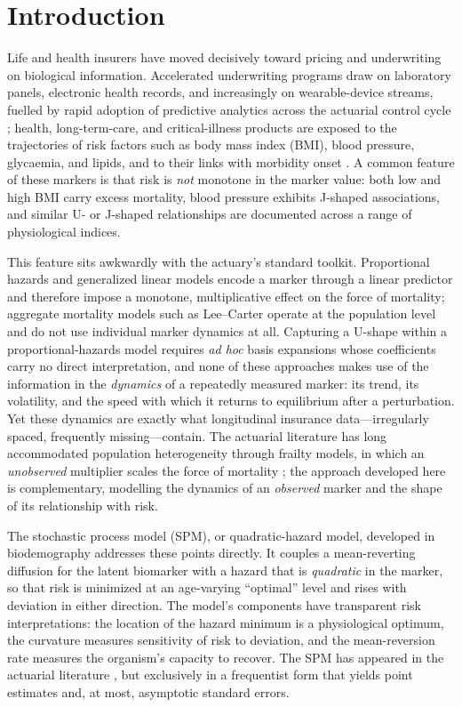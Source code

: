 \documentclass[review,3p,times]{elsarticle}
\begin{document}
\section{Introduction}\label{sec:intro}

Life and health insurers have moved decisively toward pricing and underwriting on
biological information. Accelerated underwriting programs draw on laboratory
panels, electronic health records, and increasingly on wearable-device streams,
fuelled by rapid adoption of predictive analytics across the actuarial control
cycle \citep{Richman2021}; health, long-term-care, and critical-illness products
are exposed to the trajectories of risk factors such as body mass index (BMI),
blood pressure, glycaemia, and lipids, and to their links with morbidity onset
\citep{HabermanPitacco1999}. A common feature of these markers is that risk is
\emph{not} monotone in the marker value: both low and high BMI carry excess
mortality, blood pressure exhibits J-shaped associations, and similar U- or
J-shaped relationships are documented across a range of physiological indices.

This feature sits awkwardly with the actuary's standard toolkit. Proportional
hazards and generalized linear models encode a marker through a linear predictor
and therefore impose a monotone, multiplicative effect on the force of mortality;
aggregate mortality models such as Lee--Carter \citep{LeeCarter1992} operate at the
population level and do not use individual marker dynamics at all. Capturing a U-shape within a
proportional-hazards model requires \emph{ad hoc} basis expansions whose
coefficients carry no direct interpretation, and none of these approaches makes
use of the information in the \emph{dynamics} of a repeatedly measured marker:
its trend, its volatility, and the speed with which it returns to equilibrium
after a perturbation. Yet these dynamics are exactly what longitudinal insurance
data---irregularly spaced, frequently missing---contain. The actuarial literature
has long accommodated population heterogeneity through frailty models, in which an
\emph{unobserved} multiplier scales the force of mortality
\citep{VaupelMantonStallard1979,SuSherris2012,Pitacco2019}; the approach developed
here is complementary, modelling the dynamics of an \emph{observed} marker and the
shape of its relationship with risk.

The stochastic process model (SPM), or quadratic-hazard model, developed in
biodemography \citep{WoodburyManton1977,Yashin2007,Yashin2012PLR} addresses these
points directly. It couples a mean-reverting diffusion for the latent biomarker
with a hazard that is \emph{quadratic} in the marker, so that risk is minimized at
an age-varying ``optimal'' level and rises with deviation in either direction. The
model's components have transparent risk interpretations: the location of the
hazard minimum is a physiological optimum, the curvature measures sensitivity of
risk to deviation, and the mean-reversion rate measures the organism's capacity to
recover. The SPM has appeared in the actuarial literature
\citep{Yashin2012NAAJ,Yashin2016NAAJ}, but exclusively in a frequentist form that
yields point estimates and, at most, asymptotic standard errors.
\end{document}
